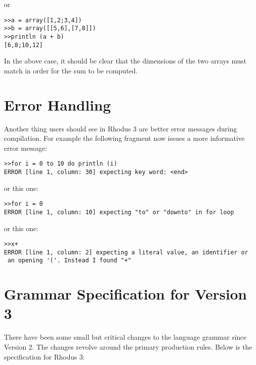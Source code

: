 or

\begin{lstlisting}
>>a = array([1,2;3,4])
>>b = array([[5,6],[7,8]])
>>println (a + b)
[6,8;10,12]
\end{lstlisting}

In the above case, it should be clear that the dimensions of the two arrays must match in order for the sum to be computed.

\section{Error Handling}

Another thing users should see in Rhodus 3 are better error messages during compilation. For example the following fragment now issues a more informative error message:

\begin{lstlisting}
>>for i = 0 to 10 do println (i)
ERROR [line 1, column: 30] expecting key word: <end>
\end{lstlisting}

or this one:

\begin{lstlisting}
>>for i = 0
ERROR [line 1, column: 10] expecting "to" or "downto" in for loop
\end{lstlisting}

or this one:

\begin{lstlisting}
>>x+
ERROR [line 1, column: 2] expecting a literal value, an identifier or
 an opening '('. Instead I found "+"
\end{lstlisting}

\section{Grammar Specification for Version 3}

There have been some small but critical changes to the language grammar since Version 2. The changes revolve around the primary production rules. Below is the specification for Rhodus 3:

